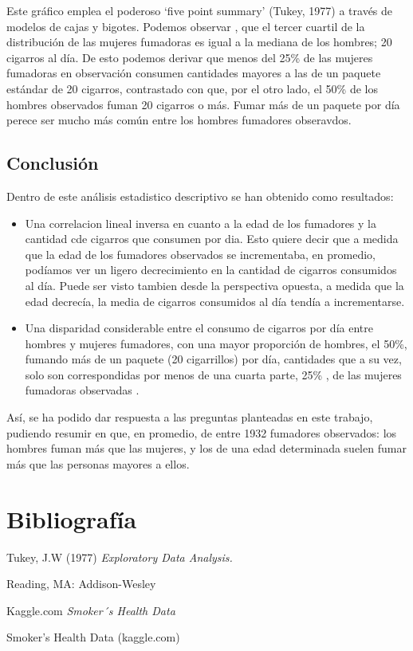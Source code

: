 \documentclass[
  stu,
  longtable,
  nolmodern,
  notxfonts,
  notimes,
  colorlinks=true,linkcolor=blue,citecolor=blue,urlcolor=blue]{apa7}
\begin{document}
Este gráfico emplea el poderoso `five point summary' (Tukey, 1977) a
través de modelos de cajas y bigotes. Podemos observar , que el tercer
cuartil de la distribución de las mujeres fumadoras es igual a la
mediana de los hombres; 20 cigarros al día. De esto podemos derivar que
menos del 25\% de las mujeres fumadoras en observación consumen
cantidades mayores a las de un paquete estándar de 20 cigarros,
contrastado con que, por el otro lado, el 50\% de los hombres observados
fuman 20 cigarros o más. Fumar más de un paquete por día perece ser
mucho más común entre los hombres fumadores obseravdos.

\subsection{Conclusión}\label{conclusiuxf3n}

Dentro de este análisis estadistico descriptivo se han obtenido como
resultados:

\begin{itemize}
\item
  Una correlacion lineal inversa en cuanto a la edad de los fumadores y
  la cantidad cde cigarros que consumen por dia. Esto quiere decir que a
  medida que la edad de los fumadores observados se incrementaba, en
  promedio, podíamos ver un ligero decrecimiento en la cantidad de
  cigarros consumidos al día. Puede ser visto tambien desde la
  perspectiva opuesta, a medida que la edad decrecía, la media de
  cigarros consumidos al día tendía a incrementarse.
\item
  Una disparidad considerable entre el consumo de cigarros por día entre
  hombres y mujeres fumadores, con una mayor proporción de hombres, el
  50\%, fumando más de un paquete (20 cigarrillos) por día, cantidades
  que a su vez, solo son correspondidas por menos de una cuarta parte,
  25\% , de las mujeres fumadoras observadas .
\end{itemize}

Así, se ha podido dar respuesta a las preguntas planteadas en este
trabajo, pudiendo resumir en que, en promedio, de entre 1932 fumadores
observados: los hombres fuman más que las mujeres, y los de una edad
determinada suelen fumar más que las personas mayores a ellos.

\section{Bibliografía}\label{bibliografuxeda}

Tukey, J.W (1977) \emph{Exploratory Data Analysis.}

Reading, MA: Addison-Wesley

Kaggle.com \emph{Smoker´s Health Data}

Smoker's Health Data (kaggle.com)
\end{document}
